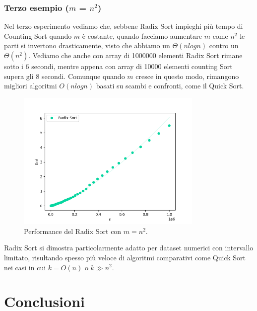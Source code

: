 \documentclass[a4paper, 12pt, oneside]{book}
\begin{document}
\subsection{Terzo esempio ($m$ = $n^2$)}

Nel terzo esperimento vediamo che, sebbene Radix Sort impieghi più tempo di Counting Sort quando \(m\) è costante, quando facciamo aumentare \(m\) come \(n^2\) le parti si invertono drasticamente, visto che abbiamo un \(\Theta(nlogn)\) contro un \(\Theta(n^2)\).
Vediamo che anche con array di 1000000 elementi Radix Sort rimane sotto i 6 secondi, mentre appena con array di 10000 elementi counting Sort supera gli 8 secondi. Comunque quando \(m\) cresce in questo modo, rimangono migliori algoritmi \(O(nlogn)\) basati su scambi e confronti, come il Quick Sort.

\begin{figure}[H]
    \centering
    \includegraphics[width=0.8\textwidth]{images/radixsort_nlogn.png}
    \caption{Performance del Radix Sort con \(m = n^2\).}
    \label{fig:radix_sort_3_way_m}
\end{figure}

\noindent Radix Sort si dimostra particolarmente adatto per dataset numerici con intervallo limitato, risultando spesso più veloce di algoritmi comparativi come Quick Sort nei casi in cui \(k = O(n)\) o \(k \gg n^2\).


\chapter{Conclusioni}\label{chap:Conclusioni} %
\end{document}
